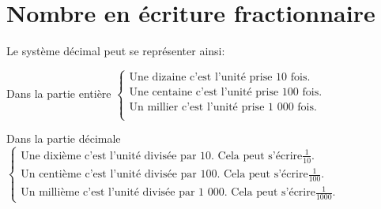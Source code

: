 \section{Nombre en écriture fractionnaire}
Le système décimal peut se représenter ainsi:

\begin{center}
\end{center}

Dans la partie entière $\left\lbrace
	\begin{matrix}
	\text{Une dizaine c'est l'unité prise 10 fois.}\\
	\text{Une centaine c'est l'unité prise 100 fois.}\\
	\text{Un millier c'est l'unité prise 1 000 fois.}\\
	\end{matrix}
\right.$ 

Dans la partie décimale $\left\lbrace
	\begin{matrix}
	\text{Une dixième c'est l'unité divisée par 10. Cela peut s'écrire} \frac{1}{10}. \\
	\text{Un centième c'est l'unité divisée par 100. Cela peut s'écrire} \frac{1}{100}. \\
	\text{Un millième c'est l'unité divisée par 1 000. Cela peut s'écrire} \frac{1}{1000}.
	\end{matrix}
\right.$


